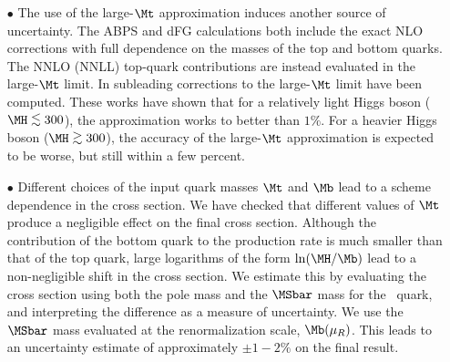 \begin{itemize}
\item[$\bullet$]  The use of the large-$\Mt$ approximation induces another source of uncertainty.
The ABPS and dFG calculations both include the exact NLO corrections with full dependence on the masses of the top and bottom quarks. 
The NNLO (NNLL) top-quark contributions are instead evaluated in the large-$\Mt$ limit. In 
subleading corrections to the large-$\Mt$ limit have been computed. These
works have shown that for a relatively light Higgs boson ($\MH\lsim 300$\UGeV),
the approximation works to better than $1\%$. For a heavier Higgs boson
($\MH\gsim 300$\UGeV), the accuracy of the large-$\Mt$ approximation is expected to be worse, but still within a few percent.

\item[$\bullet$] Different choices of the input quark masses $\Mt$ and $\Mb$ lead to
a scheme dependence in the cross section.  We have 
checked that different values of $\Mt$ produce a negligible effect on the final cross section.  Although the contribution of the bottom quark to the 
production rate is much smaller than that of the top quark, large logarithms of the form ${\rm ln}(\MH / \Mb)$ lead to a non-negligible shift in the 
cross section. We estimate this by evaluating the cross section using both the pole mass and the $\MSbar$ mass for the \PQb\ quark, and interpreting 
the difference as a measure of uncertainty.  We use the $\MSbar$ mass evaluated at the renormalization scale, $\Mb(\mu_R)$. This leads to an uncertainty estimate of approximately $\pm 1{-}2\%$ on the final result.



\end{itemize}
